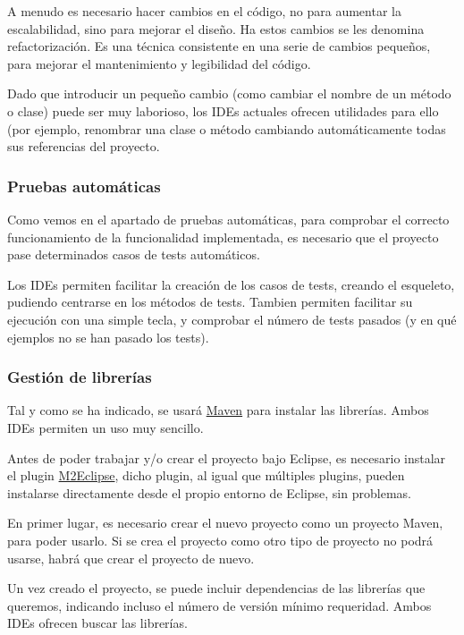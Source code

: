 \documentclass[11pt]{article}
\begin{document}
A menudo es necesario hacer cambios en el código, no para aumentar la escalabilidad, sino para mejorar el diseño.
Ha estos cambios se les denomina refactorización. Es una técnica consistente en una serie de cambios pequeños, para
mejorar el mantenimiento y legibilidad del código. 


Dado que introducir un pequeño cambio (como cambiar el nombre de un método o clase) puede ser muy laborioso, los
IDEs actuales ofrecen utilidades para ello (por ejemplo, renombrar una clase o método cambiando automáticamente
todas sus referencias del proyecto. 
\subsubsection{Pruebas automáticas}
\label{sec-3-2-4}




Como vemos en el apartado de pruebas automáticas, para comprobar el correcto funcionamiento de la funcionalidad 
implementada, es necesario que el proyecto pase determinados casos de tests automáticos. 


Los IDEs permiten facilitar la creación de los casos de tests, creando el esqueleto, pudiendo centrarse en 
los métodos de tests. Tambien permiten facilitar su ejecución con una simple tecla, y comprobar el número de tests
pasados (y en qué ejemplos no se han pasado los tests).
\subsubsection{Gestión de librerías}
\label{sec-3-2-5}




Tal y como se ha indicado, se usará \hyperref[sec-5]{Maven} para instalar las librerías. Ambos IDEs permiten un uso muy sencillo. 


Antes de poder trabajar y/o crear el proyecto bajo Eclipse, es necesario instalar el plugin \href{http://m2eclipse.sonatype.org/}{M2Eclipse}, dicho
plugin, al igual que múltiples plugins, pueden instalarse directamente desde el propio entorno de Eclipse, 
sin problemas.


En primer lugar, es necesario crear el nuevo proyecto como un proyecto Maven, para poder usarlo. Si se crea el
proyecto como otro tipo de proyecto no podrá usarse, habrá que crear el proyecto de nuevo. 


Un vez creado el proyecto, se puede incluir dependencias de las librerías que queremos, indicando incluso el
número de versión mínimo requeridad. Ambos IDEs ofrecen buscar las librerías. 
\end{document}
